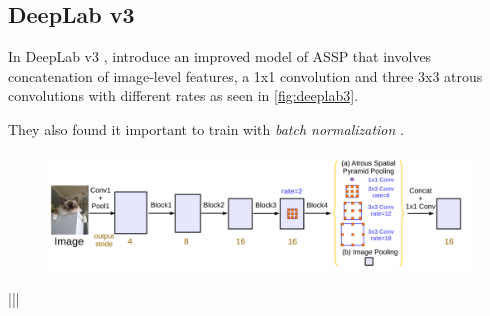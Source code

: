 \subsection{DeepLab v3}
In DeepLab v3 \cite{Chen2017a}, \citeauthor{Chen2017a} introduce an improved model of ASSP that involves concatenation of image-level features, a 1x1 convolution and three 3x3 atrous convolutions with different rates as seen in \autoref{fig:deeplab3}.

They also found it important to train with \emph{batch normalization} \cite{Ioffe2015}.


\begin{figure}[H]
	\centering
	\includegraphics[width=\linewidth]{fig/deeplab3.png}
	\label{fig:deeplab3}
\end{figure}|||



